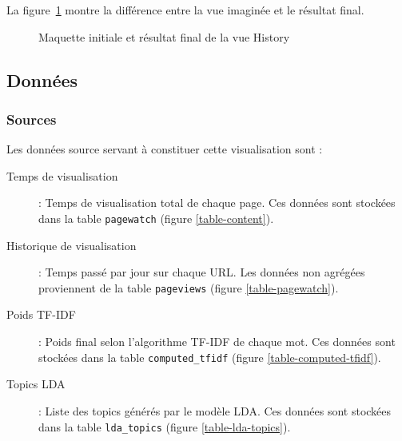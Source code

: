 		La figure~\ref{history_images} montre la différence entre la vue imaginée et le résultat final.

		\begin{figure}[!h]
			\centering
			\caption{Maquette initiale et résultat final de la vue History}
			\label{history_images}
		\end{figure}

	\subsection{Données}

		\subsubsection{Sources}

			Les données source servant à constituer cette visualisation sont :
			\begin{description}
				\item[Temps de visualisation] : Temps de visualisation total de chaque page. Ces données sont stockées dans la table \texttt{pagewatch} (figure \ref{table-content}).
				\item[Historique de visualisation] : Temps passé par jour sur chaque URL. Les données non agrégées proviennent de la table \texttt{pageviews} (figure \ref{table-pagewatch}).
				\item[Poids TF-IDF] : Poids final selon l'algorithme TF-IDF de chaque mot. Ces données sont stockées dans la table \texttt{computed\_tfidf} (figure \ref{table-computed-tfidf}).
				\item[Topics LDA] : Liste des topics générés par le modèle LDA. Ces données sont stockées dans la table \texttt{lda\_topics} (figure \ref{table-lda-topics}).
			\end{description}

